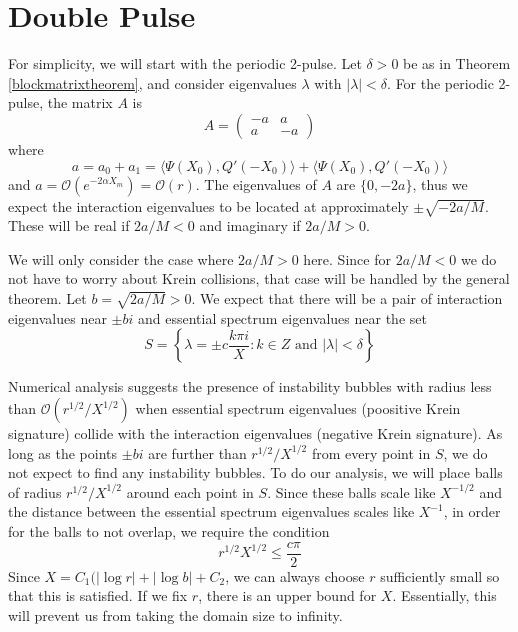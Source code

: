 \documentclass[thesis.tex]{subfiles}
\begin{document}
\chapter{Double Pulse}

For simplicity, we will start with the periodic 2-pulse. Let $\delta > 0$ be as in Theorem \ref{blockmatrixtheorem}, and consider eigenvalues $\lambda$ with $|\lambda| < \delta$. For the periodic 2-pulse, the matrix $A$ is
\[
A = \begin{pmatrix}
-a & a \\
a & -a
\end{pmatrix}
\]
where
\[
a = a_0 + a_1 = \langle \Psi(X_0), Q'(-X_0) \rangle + \langle \Psi(X_0), Q'(-X_0) \rangle
\]
and $a = \mathcal{O}(e^{-2\alpha X_m}) = \mathcal{O}(r)$. The eigenvalues of $A$ are $\{0, -2a\}$, thus we expect the interaction eigenvalues to be located at approximately $\pm \sqrt{-2a/M}$. These will be real if $2a/M < 0$ and imaginary if $2a/M > 0$. 

We will only consider the case where $2a/M > 0$ here. Since for $2a/M < 0$ we do not have to worry about Krein collisions, that case will be handled by the general theorem. Let $b = \sqrt{2a/M} > 0$. We expect that there will be a pair of interaction eigenvalues near $\pm b i$ and essential spectrum eigenvalues near the set 
\[
S = \left\{ \lambda = \pm c \frac{k \pi i}{X} : k \in Z \text{ and }|\lambda| < \delta  \right\} 
\]

Numerical analysis suggests the presence of instability bubbles with radius less than $\mathcal{O}(r^{1/2}/X^{1/2})$ when essential spectrum eigenvalues (poositive Krein signature) collide with the interaction eigenvalues (negative Krein signature). As long as the points $\pm b i$ are further than $r^{1/2}/X^{1/2}$ from every point in $S$, we do not expect to find any instability bubbles. To do our analysis, we will place balls of radius $r^{1/2}/X^{1/2}$ around each point in $S$. Since these balls scale like $X^{-1/2}$ and the distance between the essential spectrum eigenvalues scales like $X^{-1}$, in order for the balls to not overlap, we require the condition
\begin{equation}\label{rXcondition}
r^{1/2}X^{1/2} \leq \frac{c \pi}{2}
\end{equation}
Since $X = C_1 ( |\log r| + |\log b| + C_2$, we can always choose $r$ sufficiently small so that this is satisfied. If we fix $r$, there is an upper bound for $X$. Essentially, this will prevent us from taking the domain size to infinity.
\end{document}
